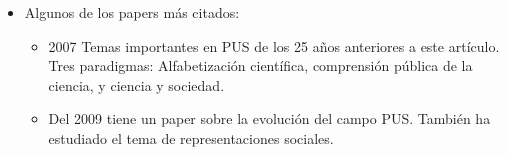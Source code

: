 \documentclass[11pt,                                                            
 superscriptaddress,twoside,
 amsmath,amssymb,
 aps, physrev
]{revtex4-2}
\begin{document}
\begin{itemize}
\begin{itemize}
	\end{itemize}
	
	\item Algunos de los papers más citados:
	\begin{itemize}
		\item 2007 \cite{Bauer2007} Temas importantes en PUS de los 25 años anteriores a este artículo. Tres paradigmas: Alfabetización científica, comprensión pública de la ciencia, y ciencia y sociedad.
		\item Del 2009 tiene un paper sobre la evolución del campo PUS. También ha estudiado el tema de representaciones sociales. 
	\end{itemize} 
	
	
\end{itemize}
\end{document}
